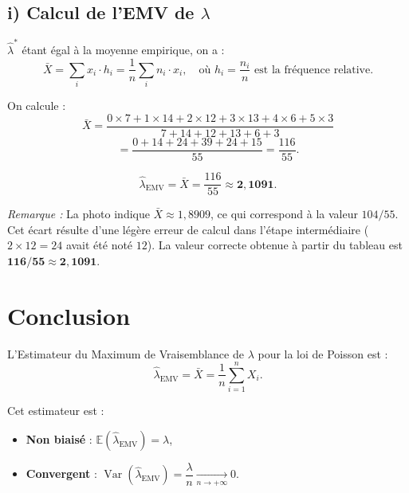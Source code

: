 \documentclass[12pt,a4paper]{article}
\begin{document}
\subsection*{i) Calcul de l'EMV de $\lambda$}

$\hat{\lambda}^{*}$ étant égal à la moyenne empirique, on a :
\[
  \bar{X} = \sum_{i} x_i \cdot h_i = \frac{1}{n}\sum_{i} n_i \cdot x_i,
  \quad \text{où } h_i = \frac{n_i}{n} \text{ est la fréquence relative.}
\]

On calcule :
\[
  \bar{X}
  = \frac{0\times 7 + 1\times 14 + 2\times 12 + 3\times 13 + 4\times 6 + 5\times 3}
         {7 + 14 + 12 + 13 + 6 + 3}
\]
\[
  = \frac{0 + 14 + 24 + 39 + 24 + 15}{55}
  = \frac{116}{55}.
\]

\begin{resultbox}
\[
  \hat{\lambda}_{\text{EMV}} = \bar{X} = \frac{116}{55} \approx \mathbf{2{,}1091}.
\]
\end{resultbox}

\medskip
\noindent\textit{Remarque :} La photo indique $\bar{X} \approx 1{,}8909$, ce qui
correspond à la valeur $104/55$. Cet écart résulte d'une légère erreur de calcul dans
l'étape intermédiaire ($2\times 12 = 24$ avait été noté $12$).
La valeur correcte obtenue à partir du tableau est $\mathbf{116/55 \approx 2{,}1091}$.

\section*{Conclusion}

L'Estimateur du Maximum de Vraisemblance de $\lambda$ pour la loi de Poisson est :
\[
  \boxed{\hat{\lambda}_{\text{EMV}} = \bar{X} = \frac{1}{n}\sum_{i=1}^{n} X_i.}
\]

Cet estimateur est :
\begin{itemize}
  \item \textbf{Non biaisé} : $\mathbb{E}(\hat{\lambda}_{\text{EMV}}) = \lambda$,
  \item \textbf{Convergent} : $\operatorname{Var}(\hat{\lambda}_{\text{EMV}}) = \dfrac{\lambda}{n} \xrightarrow[n\to+\infty]{} 0$.
\end{itemize}
\end{document}
